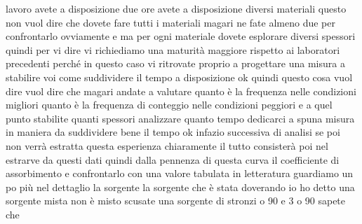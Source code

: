 lavoro avete a disposizione due ore avete a disposizione diversi materiali questo non vuol dire che dovete fare tutti i materiali magari ne fate almeno due per confrontarlo ovviamente e ma per ogni materiale dovete esplorare diversi spessori quindi per vi dire vi richiediamo una maturità maggiore rispetto ai laboratori precedenti perché in questo caso vi ritrovate proprio a progettare una misura a stabilire voi come suddividere il tempo a disposizione ok quindi questo cosa vuol dire vuol dire che magari andate a valutare quanto è la frequenza nelle condizioni migliori quanto è la frequenza di conteggio nelle condizioni peggiori e a quel punto stabilite quanti spessori analizzare quanto tempo dedicarci a spuna misura in maniera da suddividere bene il tempo ok infazio successiva di analisi se poi non verrà estratta questa esperienza chiaramente il tutto consisterà poi nel estrarve da questi dati quindi dalla pennenza di questa curva il coefficiente di assorbimento e confrontarlo con una valore tabulata in letteratura guardiamo un po più nel dettaglio la sorgente la sorgente che è stata doverando io ho detto una sorgente mista non è misto scusate una sorgente di stronzi o 90 e 3 o 90 sapete che

